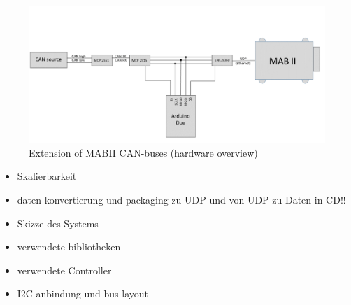 \documentclass[ExampleMasters.tex]{subfiles}
\begin{document}
\begin{figure}[h]
\centering
\includegraphics[width=1\linewidth]{figures/can_extension}
\caption{Extension of MABII CAN-buses (hardware overview)}
\label{fig:can_extension}
\end{figure}


\begin{itemize}
	\item Skalierbarkeit
	\item daten-konvertierung und packaging zu UDP und von UDP zu Daten in CD!!
	\item Skizze des Systems
	\item verwendete bibliotheken
	\item verwendete Controller
	\item I2C-anbindung und bus-layout
\end{itemize}
\end{document}
